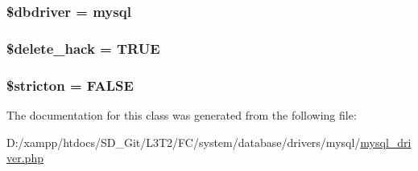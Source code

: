 \subsubsection[{\$dbdriver}]{\setlength{\rightskip}{0pt plus 5cm}\$dbdriver = \textquotesingle{}mysql\textquotesingle{}}\label{class_c_i___d_b__mysql__driver_a0cde2a16322a023d040aa7f725877597}
\hypertarget{class_c_i___d_b__mysql__driver_ad60008f32a478e978c7c3284f320f273}{}
\subsubsection[{\$delete\+\_\+hack}]{\setlength{\rightskip}{0pt plus 5cm}\$delete\+\_\+hack = T\+R\+U\+E}\label{class_c_i___d_b__mysql__driver_ad60008f32a478e978c7c3284f320f273}
\hypertarget{class_c_i___d_b__mysql__driver_afb42d9811bec1da94506e5764e1439e0}{}
\subsubsection[{\$stricton}]{\setlength{\rightskip}{0pt plus 5cm}\$stricton = F\+A\+L\+S\+E}\label{class_c_i___d_b__mysql__driver_afb42d9811bec1da94506e5764e1439e0}


The documentation for this class was generated from the following file\+:\begin{DoxyCompactItemize}
\item 
D\+:/xampp/htdocs/\+S\+D\+\_\+\+Git/\+L3\+T2/\+F\+C/system/database/drivers/mysql/\hyperlink{mysql__driver_8php}{mysql\+\_\+driver.\+php}\end{DoxyCompactItemize}
